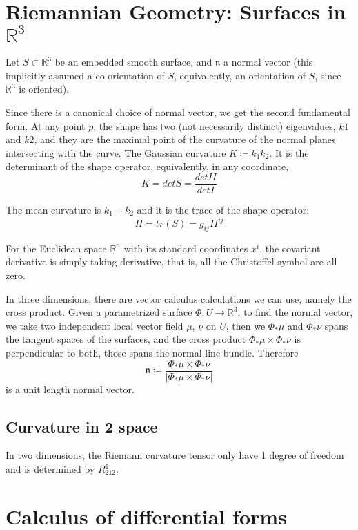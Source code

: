 \documentclass[main.tex]{subfiles}
\begin{document}
\section{Riemannian Geometry: Surfaces in $\mathbb{R}^3$}

Let $S \subset \mathbb{R}^3$ be an embedded smooth surface, and $\mathfrak{n}$ a normal vector (this implicitly assumed a co-orientation of $S$, equivalently, an orientation of $S$, since $\mathbb{R}^3$ is oriented).

Since there is a canonical choice of normal vector, we get the second fundamental form. At any point $p$, the shape has two (not necessarily distinct) eigenvalues, $k1$ and $k2$, and they are the maximal point of the curvature of the normal planes intersecting with the curve. The Gaussian curvature $K \coloneqq k_1 k_2$. It is the determinant of the shape operator, equivalently, in any coordinate, 
$$
K = det S = \frac{det II}{det I}
$$

The mean curvature is $k_1 + k_2$ and it is the trace of the shape operator:
$$
H = tr(S) = g_{ij} II^{ij}
$$

For the Euclidean space $\mathbb{R}^n$ with its standard coordinates $x^i$, the covariant derivative is simply taking derivative, that is, all the Christoffel symbol are all zero.

In three dimensions, there are vector calculus calculations we can use, namely the cross product. Given a parametrized surface $\Phi: U \rightarrow \mathbb{R}^3$, to find the normal vector, we take two independent local vector field $\mu$, $\nu$ on $U$, then we $\Phi_* {\mu}$ and $\Phi_* \nu$ spans the tangent spaces of the surfaces, and the cross product $\Phi_* \mu \times \Phi_* \nu$ is perpendicular to both, those spans the normal line bundle. Therefore 
$$
\mathfrak{n} \coloneqq \frac{\Phi_* \mu \times \Phi_* \nu}{|\Phi_* \mu \times \Phi_* \nu|}
$$
is a unit length normal vector. 

\subsection{Curvature in 2 space}

In two dimensions, the Riemann curvature tensor only have 1 degree of freedom and is determined by 
$R^1 _{212}$. 





\section{Calculus of differential forms}
\end{document}
